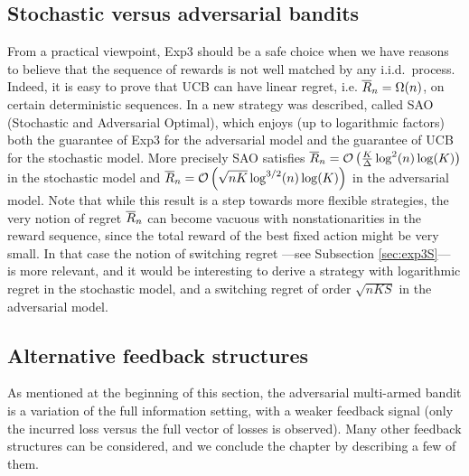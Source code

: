 \subsection{Stochastic versus adversarial bandits} \label{sec:best-of-both}
From a practical viewpoint, Exp3 should be a safe choice when we have reasons to believe that the sequence of rewards is not well matched by any i.i.d.\ process. Indeed, it is easy to prove that UCB can have linear regret, i.e. $\overline{R}_n = \Omega(n)$, on certain deterministic sequences. In \cite{BS12} a new strategy was described, called SAO (Stochastic and Adversarial Optimal), which enjoys (up to logarithmic factors) both the guarantee of Exp3 for the adversarial model and the guarantee of UCB for the stochastic model. More precisely SAO satisfies $\overline{R}_n = \mathcal{O} \left(\frac{K}{\Delta} \log^2(n) \log(K) \right)$ in the stochastic model and $\overline{R}_n = \mathcal{O} \left( \sqrt{n K} \log^{3/2}(n) \log(K) \right)$ in the adversarial model. Note that while this result is a step towards more flexible strategies, the very notion of regret $\overline{R}_n$ can become vacuous with nonstationarities in the reward sequence, since the total reward of the best fixed action might be very small. In that case the notion of switching regret ---see Subsection \ref{sec:exp3S}--- is more relevant, and it would be interesting to derive a strategy with logarithmic regret in the stochastic model, and a switching regret of order $\sqrt{n K S}$ in the adversarial model.



\subsection{Alternative feedback structures} \label{sec:feedback}
As mentioned at the beginning of this section, the adversarial multi-armed bandit is a variation of the full information setting, with a weaker feedback signal (only the incurred loss versus the full vector of losses is observed). Many other feedback structures can be considered, and we conclude the chapter by describing a few of them.

